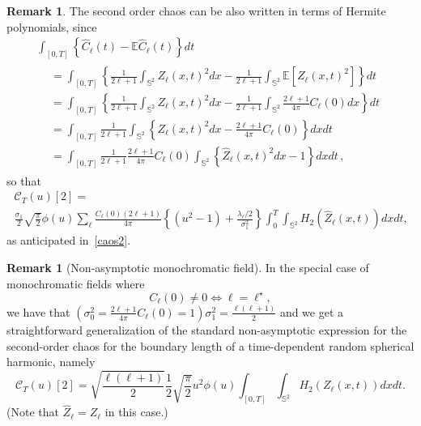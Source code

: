 \documentclass[10pt]{amsart}
\theoremstyle{definition}\newtheorem{defi}[theo]{Definition}\newtheorem{rema}[theo]{Remark}\newtheorem{exam}[theo]{Example}\newtheorem{exem}[theo]{Example}\newtheorem{nota}[theo]{Notation}
\newcommand{\clC}{\mathcal{C}}
\newcommand{\bbS}{\mathbb{S}}
\newcommand{\bbE}{\mathbb{E}}
\begin{document}
\begin{rema}\label{2chaos-hermite}
The second order chaos can be also written in terms of Hermite polynomials, since
\begin{multline*}
\int_{[0,T]}\left\{ \widehat{C}_{\ell }(t)-\bbE\widehat{C}_{\ell }(t)\right\} dt \\
\begin{aligned}
&= \int_{[0,T]}\left\{\frac{1}{2\ell+1}\int_{\bbS^2}Z_\ell(x,t)^2dx-
\frac{1}{2\ell+1}\int_{\bbS^2}\bbE\left[Z_\ell(x,t)^2\right]\right\} dt \\
&= \int_{[0,T]}\left\{\frac{1}{2\ell+1}\int_{\bbS^2}Z_\ell(x,t)^2dx-
\frac{1}{2\ell+1}\int_{\bbS^2}\frac{2\ell+1}{4\pi}C_{\ell }(0)dx\right\} dt \\
&= \int_{[0,T]}\frac{1}{2\ell+1}\int_{\bbS^2}\left\{Z_\ell(x,t)^2dx-
\frac{2\ell+1}{4\pi}C_{\ell }(0)\right\} dxdt \\
&= \int_{[0,T]}\frac{1}{2\ell+1}\frac{2\ell+1}{4\pi}C_{\ell }(0)\int_{
\bbS^2}\left\{\widehat Z_\ell(x,t)^2dx-1\right\}dxdt\,,
\end{aligned}
\end{multline*}
so that
\begin{multline*}
\clC_T(u)[2]=\\
\frac{\sigma _{1}}{2}\sqrt{\frac{\pi }{2}}\phi (u)\sum_{\ell } \frac{C_{\ell }(0)(2\ell +1)}{4\pi } \left\{\left(u^{2}-1\right)+\frac{\lambda _{\ell }/2}{\sigma _{1}^{2}}\right\} \int_0^T\int_{\bbS^{2}}H_{2}\left(\widehat Z_{\ell }(x,t)\right)dxdt\text{,}
\end{multline*}
as anticipated in~\eqref{caos2}.
\end{rema}

\begin{rema}[Non-asymptotic monochromatic field]\label{2chaos_mono}
In the special case of monochromatic fields where
\begin{equation*}
C_{\ell }(0)\neq 0\Leftrightarrow \ell =\ell ^{\star },
\end{equation*}
we have that $(\sigma^2_0= \frac{2\ell+1}{4\pi}C_\ell(0)=1)
\sigma^2 _{1}=\frac{\ell (\ell +1)}{2}$ and we get a straightforward generalization of the standard non-asymptotic expression for the second-order chaos for the boundary length of a time-dependent random spherical harmonic, namely
\[
\clC_T(u)[2] =\sqrt{\frac{\ell (\ell +1)}{2}}\frac{1}{2}\sqrt{\frac{
\pi }{2}}u^{2}\phi (u)\int_{[0,T]}\int_{\bbS^{2}} H_2(Z_\ell(x,t)) dxdt.
\]
(Note that $\widehat{Z}_\ell = Z_\ell$ in this case.)
\end{rema}
\end{document}
